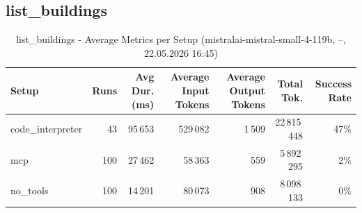\documentclass[a4paper,11pt]{article}
\begin{document}
\subsection{list\_buildings}

\begin{table}[H]
\centering
\scriptsize
\caption{list\_buildings - Average Metrics per Setup (mistralai-mistral-small-4-119b, --, 22.05.2026 16:45)}
\label{tab:combined\_list\_buildings\_metrics\_20260522}
\begin{tabular}{l r r r r r r}
\toprule
Setup & Runs & Avg Dur. (ms) & Average Input Tokens & Average Output Tokens & Total Tok. & Success Rate \\
\midrule
code\_interpreter & 43 & 95\,653 & 529\,082 & 1\,509 & 22\,815\,448 & 47\% \\
mcp & 100 & 27\,462 & 58\,363 & 559 & 5\,892\,295 & 2\% \\
no\_tools & 100 & 14\,201 & 80\,073 & 908 & 8\,098\,133 & 0\% \\
\bottomrule
\end{tabular}
\end{table}
\end{document}
